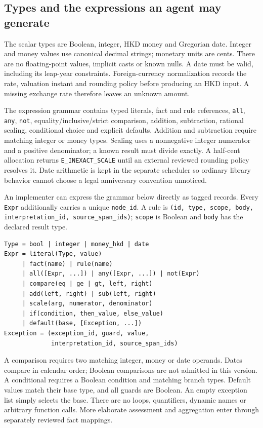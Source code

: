 \documentclass[12pt,a4paper,oneside,openany]{book}
\begin{document}
\subsection{Types and the expressions an agent may generate}
\label{merge:P-03a-rule-contract:00}


The scalar types are Boolean, integer, HKD money and Gregorian date. Integer
and money values use canonical decimal strings; monetary units are cents.
There are no floating-point values, implicit casts or known nulls. A date must
be valid, including its leap-year constraints. Foreign-currency normalization
records the rate, valuation instant and rounding policy before producing an HKD
input. A missing exchange rate therefore leaves an unknown amount.

The expression grammar contains typed literals, fact and rule references,
\texttt{all}, \texttt{any}, \texttt{not}, equality/inclusive/strict comparison,
addition, subtraction, rational scaling, conditional choice and explicit defaults.
Addition and subtraction require matching integer or money types. Scaling uses
a nonnegative integer numerator and a positive denominator; a known result must
divide exactly. A half-cent allocation returns \texttt{E\_INEXACT\_SCALE} until
an external reviewed rounding policy resolves it. Date arithmetic is kept in
the separate scheduler so ordinary library behavior cannot choose a legal
anniversary convention unnoticed.

An implementer can express the grammar below directly as tagged records. Every
\texttt{Expr} additionally carries a unique \texttt{node\_id}. A rule is
\texttt{(id, type, scope, body, interpretation\_id, source\_span\_ids)};
\texttt{scope} is Boolean and \texttt{body} has the declared result type.
\begin{lstlisting}[caption={Complete operator grammar for RuleIR 0.1; repeated arguments are ordered. The Java demonstration implements a stated subset.}]
Type = bool | integer | money_hkd | date
Expr = literal(Type, value)
     | fact(name) | rule(name)
     | all([Expr, ...]) | any([Expr, ...]) | not(Expr)
     | compare(eq | ge | gt, left, right)
     | add(left, right) | sub(left, right)
     | scale(arg, numerator, denominator)
     | if(condition, then_value, else_value)
     | default(base, [Exception, ...])
Exception = (exception_id, guard, value,
             interpretation_id, source_span_ids)
\end{lstlisting}
A comparison requires two matching integer, money or date operands. Dates
compare in calendar order; Boolean comparisons are not admitted in this version.
A conditional requires a Boolean condition and matching branch types. Default
values match their base type, and all guards are Boolean. An empty exception
list simply selects the base. There are no loops, quantifiers, dynamic names or
arbitrary function calls. More elaborate assessment and aggregation enter
through separately reviewed fact mappings.
\end{document}
